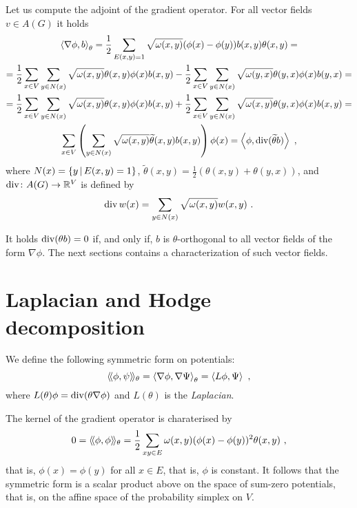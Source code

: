 \documentclass[12pt,a4paper]{amsart}
\begin{document}
Let us compute the adjoint of the gradient operator. For all vector
fields $v \in A(G)$ it holds
\begin{multline*}
  \left\langle\nabla \phi,b\right\rangle_{\theta}  = \frac12 \sum_{E(x,y)=1}
  \sqrt{\omega(x,y)}  (\phi(x) - \phi(y)) b(x,y) \theta(x,y)= \\
  = \frac12 \sum_{x \in V} \sum_{y \in N(x)} \sqrt{\omega(x,y)}
  \theta(x,y) \phi(x)
b(x,y) - \frac12 \sum_{x \in V} \sum_{y \in N(x)}
  \sqrt{\omega(y,x)}  \theta(y,x) \phi(x) b(y,x) = \\   = \frac12 \sum_{x \in V} \sum_{y \in N(x)} \sqrt{\omega(x,y)}
  \theta(x,y) \phi(x)
b(x,y) + \frac12 \sum_{x \in V} \sum_{y \in N(x)}
  \sqrt{\omega(x,y)}  \theta(y,x) \phi(x) b(x,y) = \\ \sum_{x \in V}
  \left(\sum_{y \in N(x)} \sqrt{\omega(x,y)}  \widetilde \theta(x,y) b(x,y) \right) \phi(x) =
  \left\langle\phi,\operatorname*{div}(\widetilde \theta b)\right\rangle \ ,
\end{multline*}
where $N(x) = \left\{y \, \middle| \, E(x,y)=1 \right\}$, $\widetilde \theta(x,y) = \frac12
(\theta(x,y)+\theta(y,x))$,  and $\operatorname*{div} \colon A(G) \to \mathbb{R}^V$ is defined by
\begin{equation*}
  \operatorname*{div} w (x) = \sum_{y \in N(x)} \sqrt {\omega(x,y)} w(x,y) \ . 
\end{equation*}

It holds $\operatorname*{div}(\theta b) = 0$ if, and only if, $b$ is $\theta$-orthogonal to
all vector fields of the form  $\nabla  \phi$. The next sections
contains a characterization of such vector fields. 

\section{Laplacian and Hodge decomposition}
\label{sec:laplacian}

We define the following symmetric form on potentials:
\begin{equation*}
  \left\langle\!\langle\phi,\psi\right\rangle\!\rangle_{\theta} = \left\langle\nabla\phi,\nabla\Psi\right\rangle_{\theta} = \left\langle L\phi,\Psi\right\rangle \ , 
\end{equation*}
where $L(\theta) \phi = \operatorname*{div}(\theta\nabla\phi)$ and $L(\theta)$ is the
\emph{Laplacian}.

The kernel of the gradient operator is charaterised by
\begin{equation*}
  0 = \left\langle\!\langle\phi,\phi\right\rangle\!\rangle_{\theta} = \frac 12 \sum_{xy \in E} \omega(x,y)
  (\phi(x) - \phi(y))^2 \theta(x,y) \ , 
\end{equation*}
that is, $\phi(x) = \phi(y)$ for all $x \in E$, that is, $\phi$ is
constant. It follows that the symmetric form is a scalar product above
on the space of sum-zero potentials, that is, on the affine space of
the probability simplex on $V$.
\end{document}
